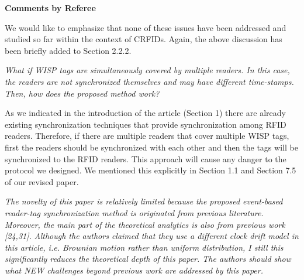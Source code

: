 \documentclass[10pt]{article}
\newcommand{\referee}[1]{
	{\item \color{OliveGreen} \emph{{#1}}}
	\label{R\therefereeCounter:\arabic{enumi}}
}
\newcommand{\response}[1]{{\color{blue} #1}}
\newcounter{refereeCounter}
\newenvironment{responses}{%
\refstepcounter{refereeCounter}%
\textbf{\large Comments by Referee \therefereeCounter}
\begin{enumerate}%
\renewcommand{\labelenumi}{\textbf{[R\therefereeCounter :\,\arabic{enumi}]}} %
}{\end{enumerate}}
\begin{document}
\begin{responses}
{We would like to emphasize that none of these issues have been addressed and studied so far within the context of CRFIDs. Again, the above discussion has been briefly added to Section 2.2.2.}

\referee{What if WISP tags are simultaneously covered by multiple readers. In this case, the readers are not synchronized themselves and may have different time-stamps. Then, how does the proposed method work?}

\response{As we indicated in the introduction of the article (Section 1) there are already existing synchronization techniques that provide synchronization among RFID readers. Therefore, if there are multiple readers that cover multiple WISP tags, first the readers should be synchronized with each other and then the tags will be synchronized to the RFID readers. This approach will cause any danger to the protocol we designed. We mentioned this explicitly in Section 1.1 and Section 7.5 of our revised paper.}
	
\referee{The novelty of this paper is relatively limited because the proposed event-based reader-tag synchronization method is originated from previous literature. Moreover, the main part of the theoretical analytics is also from previous work [24,31]. Although the authors claimed that they use a different clock drift model in this article, i.e. Brownian motion rather than uniform distribution, I still this significantly reduces the theoretical depth of this paper. The authors should show what NEW challenges beyond previous work are addressed by this paper.}


\end{responses}
\end{document}
